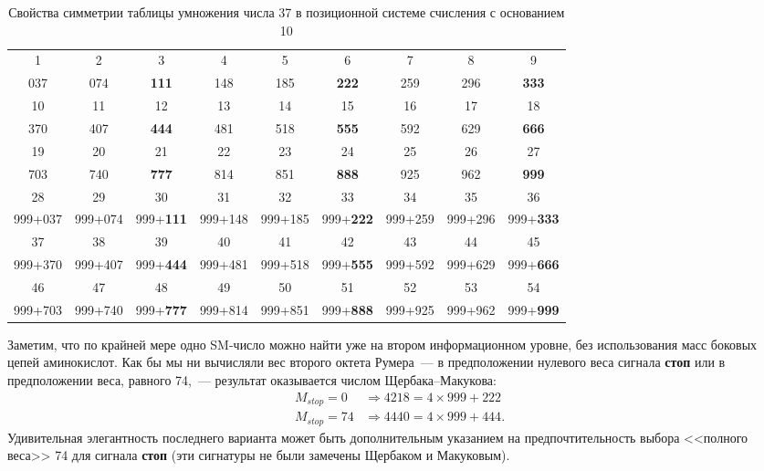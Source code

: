 \documentclass[12pt]{article}
\begin{document}
\begin{table}[htbp]
\centering
\caption{Свойства симметрии таблицы умножения числа 37 в позиционной системе счисления с основанием 10}
\label{tab:mult37}
\footnotesize
\begin{tabular}{|c|c|c|c|c|c|c|c|c|}
\hline
1 & 2 & 3 & 4 & 5 & 6 & 7 & 8 & 9 \\
037 & 074 & \textbf{111} & 148 & 185 & \textbf{222} & 259 & 296 & \textbf{333} \\
\hline
10 & 11 & 12 & 13 & 14 & 15 & 16 & 17 & 18 \\
370 & 407 & \textbf{444} & 481 & 518 & \textbf{555} & 592 & 629 & \textbf{666} \\
\hline
19 & 20 & 21 & 22 & 23 & 24 & 25 & 26 & 27 \\
703 & 740 & \textbf{777} & 814 & 851 & \textbf{888} & 925 & 962 & \textbf{999} \\
\hline
28 & 29 & 30 & 31 & 32 & 33 & 34 & 35 & 36 \\
999+037 & 999+074 & 999+\textbf{111} & 999+148 & 999+185 & 999+\textbf{222} & 999+259 & 999+296 & 999+\textbf{333} \\
\hline
37 & 38 & 39 & 40 & 41 & 42 & 43 & 44 & 45 \\
999+370 & 999+407 & 999+\textbf{444} & 999+481 & 999+518 & 999+\textbf{555} & 999+592 & 999+629 & 999+\textbf{666} \\
\hline
46 & 47 & 48 & 49 & 50 & 51 & 52 & 53 & 54 \\
999+703 & 999+740 & 999+\textbf{777} & 999+814 & 999+851 & 999+\textbf{888} & 999+925 & 999+962 & 999+\textbf{999} \\
\hline
\end{tabular}
\end{table}

Заметим, что по крайней мере одно SM-число можно найти уже на втором информационном уровне, без использования масс боковых цепей аминокислот. Как бы мы ни вычисляли вес второго октета Румера~--- в предположении нулевого веса сигнала \textbf{стоп} или в предположении веса, равного 74,~--- результат оказывается числом Щербака--Макукова:
\begin{align*}
M_{stop} = 0 &\Rightarrow 4218 = 4 \times 999 + 222 \\
M_{stop} = 74 &\Rightarrow 4440 = 4 \times 999 + 444.
\end{align*}
Удивительная элегантность последнего варианта может быть дополнительным указанием на предпочтительность выбора <<полного веса>> 74 для сигнала \textbf{стоп} (эти сигнатуры не были замечены Щербаком и Макуковым).
\end{document}
